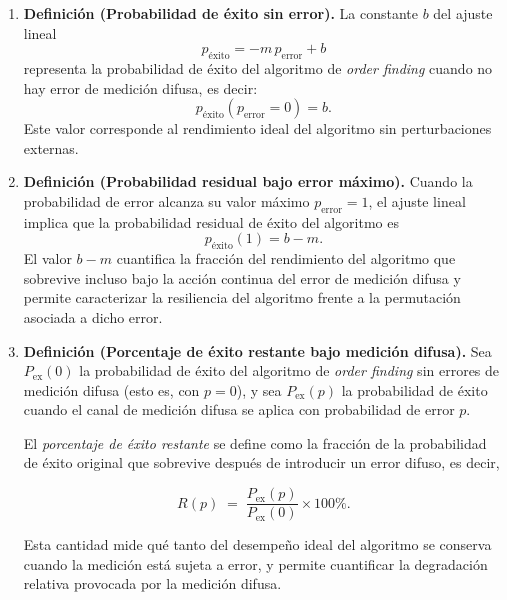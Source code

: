 \documentclass[letterpaper]{article}
\begin{document}
\begin{enumerate}
\item \textbf{Definición (Probabilidad de éxito sin error).}
La constante $b$ del ajuste lineal
\[
p_{\mathrm{éxito}} = -m\,p_{\mathrm{error}} + b
\]
representa la probabilidad de éxito del algoritmo de \emph{order finding} cuando no hay error de medición difusa, es decir:
\[
p_{\mathrm{éxito}}(p_{\mathrm{error}}=0)=b.
\]
Este valor corresponde al rendimiento ideal del algoritmo sin perturbaciones externas.

\item \textbf{Definición (Probabilidad residual bajo error máximo).}
Cuando la probabilidad de error alcanza su valor máximo $p_{\mathrm{error}}=1$, el ajuste lineal implica que la probabilidad residual de éxito del algoritmo es
\[
p_{\mathrm{éxito}}(1)=b-m.
\]
El valor $b-m$ cuantifica la fracción del rendimiento del algoritmo que sobrevive incluso bajo la acción continua del error de medición difusa y permite caracterizar la resiliencia del algoritmo frente a la permutación asociada a dicho error.

\item \textbf{Definición (Porcentaje de éxito restante bajo medición difusa).}
Sea $P_{\mathrm{ex}}(0)$ la probabilidad de éxito del algoritmo de  \emph{order finding} sin errores de medición difusa (esto es, con $p=0$), y sea $P_{\mathrm{ex}}(p)$ la probabilidad de éxito cuando el canal de medición difusa se aplica con probabilidad de error $p$.

El \emph{porcentaje de éxito restante} se define como la fracción de la  probabilidad de éxito original que sobrevive después de introducir un error  difuso, es decir,

\[
R(p) \;=\; \frac{P_{\mathrm{ex}}(p)}{P_{\mathrm{ex}}(0)} \times 100\%.
\]

Esta cantidad mide qué tanto del desempeño ideal del algoritmo se conserva  cuando la medición está sujeta a error, y permite cuantificar la degradación  relativa provocada por la medición difusa.



\end{enumerate}

    
    
	
       
\printbibliography[heading=bibintoc]
	
	
	
\end{document}
